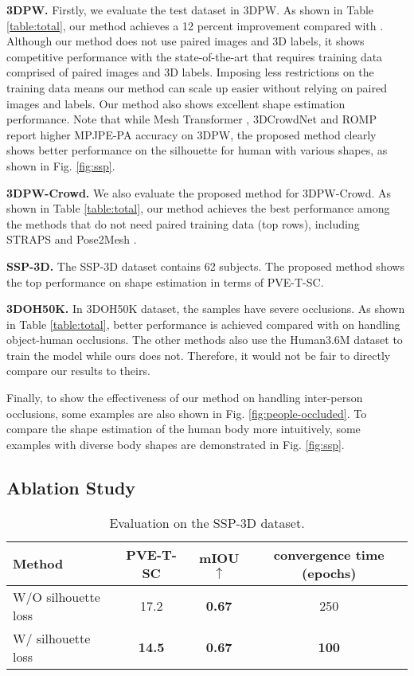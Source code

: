 \documentclass[journal]{IEEEtran}
\begin{document}
\noindent\textbf{3DPW.} Firstly, we evaluate the test dataset in 3DPW. As shown in Table \ref{table:total}, our method achieves a 12 percent improvement compared with \cite{STRAPS2020BMVC}. Although our method does not use paired images and 3D labels, it shows competitive performance with the state-of-the-art that requires training data comprised of paired images and 3D labels. Imposing less restrictions on the training data means our method can scale up easier without relying on paired images and labels. Our method also shows excellent shape estimation performance.  Note that while Mesh Transformer \cite{lin2021end-to-end}, 3DCrowdNet \cite{choi20213dcrowdnet} and ROMP \cite{ROMP} report higher MPJPE-PA accuracy on 3DPW, the proposed method clearly shows better performance on the silhouette for human with various shapes, as shown in Fig. \ref{fig:ssp}.


\noindent\textbf{3DPW-Crowd.} We also evaluate the proposed method for 3DPW-Crowd. As shown in Table \ref{table:total}, our method achieves the best performance among the methods that do not need paired training data (top rows), including STRAPS \cite{STRAPS2020BMVC} and Pose2Mesh \cite{Choi_2020_ECCV_Pose2Mesh}. 

\noindent\textbf{SSP-3D.} The SSP-3D dataset contains 62 subjects. The proposed method shows the top performance on shape estimation in terms of PVE-T-SC.

\noindent\textbf{3DOH50K.} In 3DOH50K dataset, the samples have severe occlusions. As shown in Table \ref{table:total}, better performance is achieved compared with \cite{STRAPS2020BMVC} on handling object-human occlusions. The other methods also use the Human3.6M dataset to train the model while ours does not. Therefore, it would not be fair to directly compare our results to theirs.



Finally, to show the effectiveness of our method on handling inter-person occlusions, some examples are also shown in Fig. \ref{fig:people-occluded}. To compare the shape estimation of the human body more intuitively, some examples with diverse body shapes are demonstrated in Fig. \ref{fig:ssp}.

\subsection{Ablation Study}
\begin{table}[htbp]
\caption{ Evaluation on the SSP-3D dataset.}
\begin{center}
\begin{tabular}{@{}lccc@{}}
\toprule
Method          & PVE-T-SC & mIOU$\uparrow$ & convergence time (epochs) \\ \midrule
W/O silhouette loss   & 17.2  & \textbf{0.67}  & 250 \\
W/ silhouette loss & \textbf{14.5}& \textbf{0.67}  & \textbf{100}\\ \bottomrule
\end{tabular}
\label{silh}
\end{center}
\end{table}
\end{document}
